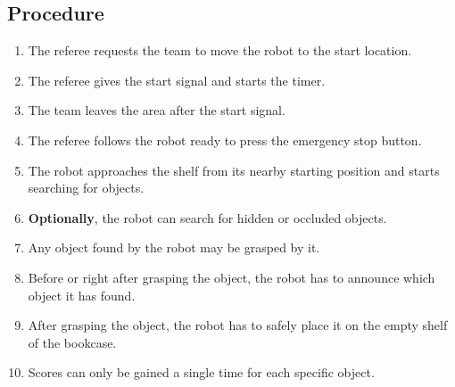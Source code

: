 \subsection*{Procedure}
	\begin{enumerate}[nosep]
		\item The referee requests the team to move the robot to the start location.
		\item The referee gives the start signal and starts the timer.
		\item The team leaves the area after the start signal.		
		\item The referee follows the robot ready to press the emergency stop button.
		
		\item The robot approaches the shelf from its nearby starting position and starts searching for objects.
		\item \textbf{Optionally}, the robot can search for hidden or occluded objects.
		\item Any object found by the robot may be grasped by it. 
		\item Before or right after grasping the object, the robot has to announce which object it has found.
		\item After grasping the object, the robot has to safely place it on the empty shelf of the bookcase.
		\item Scores can only be gained a single time for each specific object.
		
	\end{enumerate}





